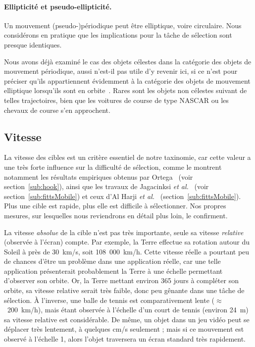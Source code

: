 	\paragraph{Ellipticité et pseudo-ellipticité.}
	Un mouvement (pseudo-)périodique peut être elliptique, voire circulaire. Nous considérons en pratique que les implications pour la tâche de sélection sont presque identiques.
	
	Nous avons déjà examiné le cas des objets célestes dans la catégorie des objets de mouvement périodique, aussi n'est-il pas utile d'y revenir ici, si ce n'est pour préciser qu'ils appartiennent évidemment à la catégorie des objets de mouvement elliptique lorsqu'ils sont en orbite~\cite{kepler1953epitome}. Rares sont les objets non célestes suivant de telles trajectoires, bien que les voitures de course de type NASCAR ou les chevaux de course s'en approchent.
	
	\subsection{Vitesse}
	La vitesse des cibles est un critère essentiel de notre taxinomie, car cette valeur a une très forte influence sur la difficulté de sélection, comme le montrent notamment les résultats empiriques obtenus par Ortega~\cite{ortega2013hook} (voir section~\ref{sub:hook}), ainsi que les travaux de Jagacinksi \emph{et al.}~\cite{jagacinski1980test} (voir section~\ref{sub:fittsMobile}) et ceux d'Al Harji \emph{et al.}~\cite{hajri2011moving} (section~\ref{sub:fittsMobile}). Plus une cible est rapide, plus elle est difficile à sélectionner. Nos propres mesures, sur lesquelles nous reviendrons en détail plus loin, le confirment.
	
	La vitesse \emph{absolue} de la cible n'est pas très importante, seule sa vitesse \emph{relative} (observée à l'écran) compte. Par exemple, la Terre effectue sa rotation autour du Soleil à près de 30~km/s, soit 108~000~km/h. Cette vitesse réelle a pourtant peu de chances d'être un problème dans une application réelle, car une telle application présenterait probablement la Terre à une échelle permettant d'observer son orbite. Or, la Terre mettant environ 365 jours à compléter son orbite, sa vitesse relative serait très faible, donc peu gênante dans une tâche de sélection. À l'inverse, une balle de tennis est comparativement lente ($\approx$~200~km/h), mais étant observée à l'échelle d'un court de tennis (environ 24~m) sa vitesse relative est considérable. De même, un objet dans un jeu vidéo peut se déplacer très lentement, à quelques cm/s seulement ; mais si ce mouvement est observé à l'échelle 1, alors l'objet traversera un écran standard très rapidement.
	
